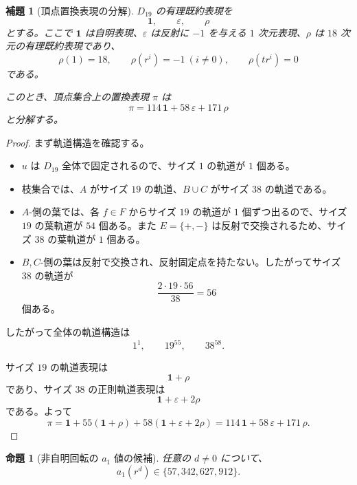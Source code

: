 \documentclass[11pt,a4paper]{article}
\theoremstyle{plain}
\newtheorem{proposition}[theorem]{命題}
\newtheorem{lemma}[theorem]{補題}
\theoremstyle{definition}
\theoremstyle{remark}
\begin{document}
\begin{lemma}[頂点置換表現の分解]\label{lem:perm-decomp}
$D_{19}$ の有理既約表現を
\[
\mathbf{1}, \qquad \varepsilon, \qquad \rho
\]
とする。ここで $\mathbf{1}$ は自明表現、$\varepsilon$ は反射に $-1$ を与える $1$ 次元表現、$\rho$ は $18$ 次元の有理既約表現であり、
\[
\rho(1) = 18, \qquad \rho(r^i) = -1\ (i \neq 0), \qquad \rho(t r^i) = 0
\]
である。

このとき、頂点集合上の置換表現 $\pi$ は
\[
\pi = 114\,\mathbf{1} + 58\,\varepsilon + 171\,\rho
\]
と分解する。
\end{lemma}

\begin{proof}
まず軌道構造を確認する。
\begin{itemize}
  \item $u$ は $D_{19}$ 全体で固定されるので、サイズ $1$ の軌道が $1$ 個ある。
  \item 枝集合では、$A$ がサイズ $19$ の軌道、$B \cup C$ がサイズ $38$ の軌道である。
  \item $A$-側の葉では、各 $f \in F$ からサイズ $19$ の軌道が $1$ 個ずつ出るので、サイズ $19$ の葉軌道が $54$ 個ある。また $E = \{+,-\}$ は反射で交換されるため、サイズ $38$ の葉軌道が $1$ 個ある。
  \item $B,C$-側の葉は反射で交換され、反射固定点を持たない。したがってサイズ $38$ の軌道が
  \[
  \frac{2 \cdot 19 \cdot 56}{38} = 56
  \]
  個ある。
\end{itemize}

したがって全体の軌道構造は
\[
1^1, \qquad 19^{55}, \qquad 38^{58}.
\]

サイズ $19$ の軌道表現は
\[
\mathbf{1} + \rho
\]
であり、サイズ $38$ の正則軌道表現は
\[
\mathbf{1} + \varepsilon + 2\rho
\]
である。よって
\[
\pi = \mathbf{1} + 55(\mathbf{1} + \rho) + 58(\mathbf{1} + \varepsilon + 2\rho) = 114\,\mathbf{1} + 58\,\varepsilon + 171\,\rho.
\]
\end{proof}

\begin{proposition}[非自明回転の $a_1$ 値の候補]\label{prop:a1cand}
任意の $d \neq 0$ について、
\[
a_1(r^d) \in \{57, 342, 627, 912\}.
\]
\end{proposition}
\end{document}
